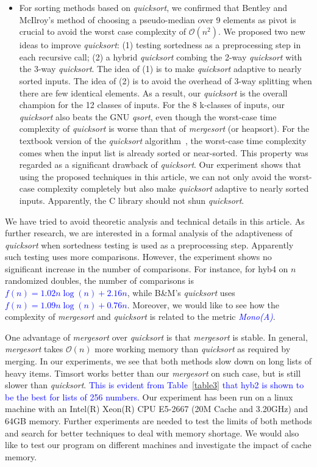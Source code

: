 \documentclass[AMA,STIX1COL]{WileyNJD-v2}
\newcommand {\mono}{\emph{\textcolor{blue}{Mono(A)}}}
\newcommand{\qusort}{\emph{quicksort }}
\newcommand{\qusortn}{\emph{quicksort}}
\newcommand{\qsortn}{\emph{qsort}}
\newcommand{\msort}{\emph{mergesort }}
\begin{document}
\begin{itemize}
\item For sorting methods based on \qusortn, we confirmed that Bentley and McIlroy’s method of choosing a pseudo-median over 9 elements as pivot is crucial to avoid the worst case complexity of $\mathcal{O}(n^2)$. 
We proposed two new ideas to improve \qusortn: (1) testing sortedness as a preprocessing step in each recursive call; (2) a hybrid \qusort combing the 2-way \qusort with the 3-way \qusortn. The idea of (1) is to make \qusort adaptive to nearly sorted inputs. The idea of (2) is to avoid the overhead of 3-way splitting when there are few identical elements. As a result, our \qusort is the overall champion for the 12 classes of inputs. For the 8 k-classes of inputs, our \qusort also beats the GNU \qsortn, even though the worst-case time complexity of \qusort is worse than that of \msort (or heapsort). For the textbook version of the \qusort algorithm~\cite{10.5555/1614191}, the worst-case time complexity comes when the input list is already sorted or near-sorted. This property was regarded as a significant drawback of \qusortn. Our experiment shows that using the proposed techniques in this article, we can not only avoid the worst-case complexity completely but also make \qusort adaptive to nearly sorted inputs. Apparently, the C library should not shun \qusortn.
\end{itemize}

We have tried to avoid theoretic analysis and technical details in this article. 
As further research, we are interested in a formal analysis of the adaptiveness of \qusort when sortedness testing is used as a preprocessing step. 
Apparently such testing uses more comparisons.  
However, the experiment shows no significant increase in the number of comparisons. 
For instance, for hyb4 on $n$ randomized doubles, the number of comparisons is \textcolor{blue}{$f(n) = 1.02n\log(n) + 2.16n$}, while B\&M’s \qusort uses \textcolor{blue}{$f(n) = 1.09n\log(n) + 0.76n$}.  
Moreover, we would like to see how the complexity of \msort and \qusort is related to the metric \mono.

One advantage of \msort over \qusort is that \msort is stable. In general, \msort takes $\mathcal{O}(n)$ more working memory than \qusort as required by merging. 
In our experiments, we see that both methods slow down on long lists of heavy items. Timsort works better than our \msort on such case, but is still slower than \qusortn. 
\textcolor{blue}{This is evident from Table~\ref{table3} that hyb2 is shown to be the best for lists of 256 numbers.}
Our experiment has been run on a linux machine with an Intel(R) Xeon(R) CPU E5-2667 (20M Cache and 3.20GHz) and 64GB memory. 
Further experiments are needed to test the limits of both methods and search for better techniques to deal with memory shortage. 
We would also like to test our program on different machines and investigate the impact of cache memory. 
\end{document}
